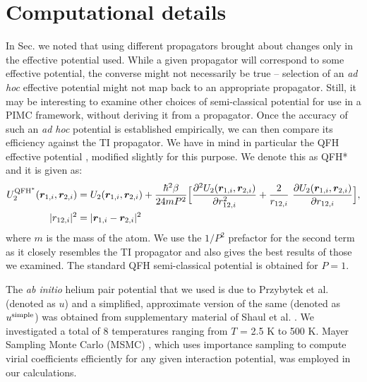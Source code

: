 \section{Computational details}
    In Sec. we noted that using different propagators brought about changes only in the effective potential used. While a given propagator will correspond to some effective potential, the converse might not necessarily be true -- selection of an \emph{ad hoc} effective potential might not map back to an appropriate propagator. Still, it may be interesting to examine other choices of semi-classical potential for use in a PIMC framework, without deriving it from a propagator. Once the accuracy of such an \emph{ad hoc} potential is established empirically, we can then compare its efficiency against the TI propagator. We have in mind in particular the QFH effective potential \cite{Feynman, Schenter2002},
    modified slightly for this purpose. We denote this as QFH* and it is given as:
    \begin{equation}\label{eq:QFHCh3}
        \begin{aligned}
            U_2^{\rm QFH^*} (\bm{r}_{1,i}, \bm{r}_{2,i}) &= U_2 (\bm{r}_{1,i}, \bm{r}_{2,i}) + \displaystyle\frac{\hbar^2 \beta}{24 m P^2} \Big[ \frac{\partial^2 U_2 (\bm{r}_{1,i}, \bm{r}_{2,i})}{\partial r_{12,i}^2} + \frac{2}{r_{12,i}}~\frac{\partial U_2 (\bm{r}_{1,i}, \bm{r}_{2,i})}{\partial r_{12,i}}  \Big],\\
            |r_{12,i}|^2 &= |\bm{r}_{1,i} - \bm{r}_{2,i}|^2
        \end{aligned}
    \end{equation}
    where $m$ is the mass of the atom. We use the $1/P^2$ prefactor for the second term as it closely resembles the TI propagator and also gives the best results of those we examined. The standard QFH semi-classical potential is obtained for $P = 1$.

    The \emph{ab initio} helium pair potential that we used is due to Przybytek et al. \cite{Przybytek2010} (denoted as $u$) and a simplified, approximate version of the same (denoted as $u^{\rm simple}$) was obtained from supplementary material of Shaul et al. \cite{Shaul2012}. We investigated a total of 8 temperatures ranging from $T$ = 2.5 K to 500 K. Mayer Sampling Monte Carlo (MSMC) \cite{Singh2004,Schultz2009}, which uses importance sampling to compute virial coefficients efficiently for any given interaction potential, was employed in our calculations.

